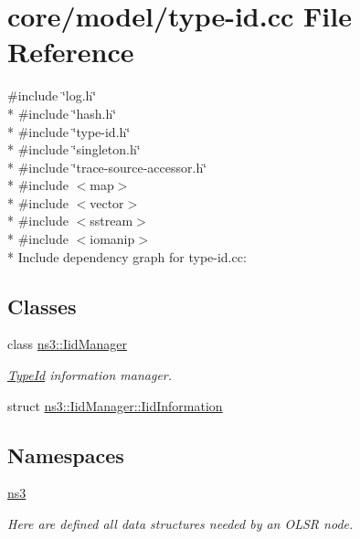 \hypertarget{type-id_8cc}{}\section{core/model/type-\/id.cc File Reference}
\label{type-id_8cc}
{\ttfamily \#include \char`\"{}log.\+h\char`\"{}}\\*
{\ttfamily \#include \char`\"{}hash.\+h\char`\"{}}\\*
{\ttfamily \#include \char`\"{}type-\/id.\+h\char`\"{}}\\*
{\ttfamily \#include \char`\"{}singleton.\+h\char`\"{}}\\*
{\ttfamily \#include \char`\"{}trace-\/source-\/accessor.\+h\char`\"{}}\\*
{\ttfamily \#include $<$map$>$}\\*
{\ttfamily \#include $<$vector$>$}\\*
{\ttfamily \#include $<$sstream$>$}\\*
{\ttfamily \#include $<$iomanip$>$}\\*
Include dependency graph for type-\/id.cc\+:
\subsection*{Classes}
\begin{DoxyCompactItemize}
\item 
class \hyperlink{classns3_1_1IidManager}{ns3\+::\+Iid\+Manager}
\begin{DoxyCompactList}\small\item\em \hyperlink{classns3_1_1TypeId}{Type\+Id} information manager. \end{DoxyCompactList}\item 
struct \hyperlink{structns3_1_1IidManager_1_1IidInformation}{ns3\+::\+Iid\+Manager\+::\+Iid\+Information}
\end{DoxyCompactItemize}
\subsection*{Namespaces}
\begin{DoxyCompactItemize}
\item 
 \hyperlink{namespacens3}{ns3}
\begin{DoxyCompactList}\small\item\em Here are defined all data structures needed by an O\+L\+SR node. \end{DoxyCompactList}\end{DoxyCompactItemize}
